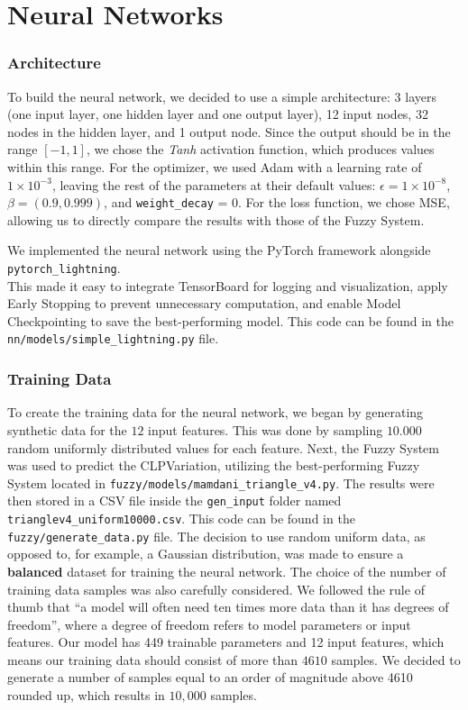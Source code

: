 \documentclass[titlepage]{article}
\begin{document}
\newpage
\part{Neural Networks}

\section{Architecture}

To build the neural network, we decided to use a simple architecture: 3 layers (one input layer, one hidden layer and one output layer), 12 input nodes, 32 nodes in the hidden layer, and 1 output node.
Since the output should be in the range \([-1, 1]\), we chose the \emph{Tanh} activation function, which produces values within this range.
For the optimizer, we used Adam with a learning rate of $1 \times 10^{-3}$, leaving the rest of the parameters at their default values: $\epsilon = 1 \times 10^{-8}$, $\beta = (0.9, 0.999)$, and \texttt{weight\_decay} = 0.
For the loss function, we chose MSE, allowing us to directly compare the results with those of the Fuzzy System.

We implemented the neural network using the PyTorch framework alongside \texttt{pytorch\_lightning}.\\
This made it easy to integrate TensorBoard for logging and visualization, apply Early Stopping to prevent unnecessary computation, and enable Model Checkpointing to save the best-performing model.
This code can be found in the \texttt{nn/models/simple\_lightning.py} file.

\section{Training Data}

To create the training data for the neural network, we began by generating synthetic data for the $12$ input features.
This was done by sampling $10.000$ random uniformly distributed values for each feature.
Next, the Fuzzy System was used to predict the CLPVariation, utilizing the best-performing Fuzzy System located in \texttt{fuzzy/models/mamdani\_triangle\_v4.py}.
The results were then stored in a CSV file inside the \texttt{gen\_input} folder named \texttt{trianglev4\_uniform10000.csv}.
This code can be found in the \texttt{fuzzy/generate\_data.py} file.
The decision to use random uniform data, as opposed to, for example, a Gaussian distribution, was made to ensure a \textbf{balanced} dataset for training the neural network.
The choice of the number of training data samples was also carefully considered.
We followed the rule of thumb that ``a model will often need ten times more data than it has degrees of freedom'', where a degree of freedom refers to model parameters or input features.
Our model has 449 trainable parameters and 12 input features, which means our training data should consist of more than $4610$ samples.
We decided to generate a number of samples equal to an order of magnitude above 4610 rounded up, which results in $10,000$ samples.
\end{document}
